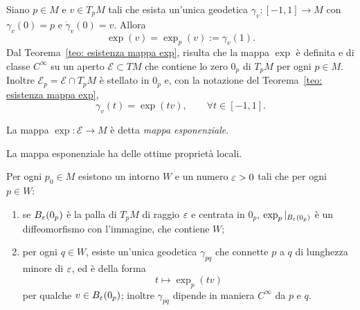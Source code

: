 		Siano \(p \in M\) e \( v \in T_pM\) tali che esista un'unica geodetica \(\gamma_v:[-1,1] \to M\) con \(\gamma_v(0)=p\) e \(\dot \gamma_v(0)=v\). Allora
		\[
		\exp(v)=\exp_p(v):= \gamma_v(1).
		\]
		Dal Teorema~\ref{teo: esistenza mappa exp}, risulta che la mappa \(\exp\) è definita e di classe \(C^\infty\) su un aperto \(\mathcal{E} \subset TM\) che contiene lo zero \(0_p\) di \(T_pM\) per ogni \(p \in M\). Inoltre \(\mathcal{E}_p = \mathcal{E} \cap T_pM\) è stellato in \(0_p\) e, con la notazione del Teorema~\ref{teo: esistenza mappa exp},
		\[
		\gamma_v(t)= \exp(tv), \qquad \forall t \in [-1,1].
		\]
		\begin{defi}
			La mappa \(\exp: \mathcal{E} \to M\) è detta \textit{mappa esponenziale}. 
		\end{defi}
	
	La mappa esponenziale ha delle ottime proprietà locali. 
	\begin{prop}\label{prop: proprietà locali exp}
		Per ogni \(p_0 \in M\) esistono un intorno \(W\) e un numero \(\varepsilon>0\) tali che per ogni \(p \in W\):
		\begin{enumerate}[label=(\roman*)]
			\item se \(B_\varepsilon(0_p)\) è la palla di \(T_pM\) di raggio \(\varepsilon\) e centrata in \(0_p\), \(\exp_p|_{B_\varepsilon(0_p)}\) è un diffeomorfismo con l'immagine, che contiene \(W\);
			\item per ogni \(q \in W\), esiste un'unica geodetica \(\gamma_{pq}\) che connette \(p\) a \(q\) di lunghezza minore di \(\varepsilon\), ed è della forma
			\[
			t \mapsto \exp_p(tv)
			\]
			per qualche \(v \in B_\varepsilon(0_p)\); inoltre \(\gamma_{pq}\) dipende in maniera \(C^\infty\) da \(p\) e \(q\).
		\end{enumerate}
	\end{prop}
